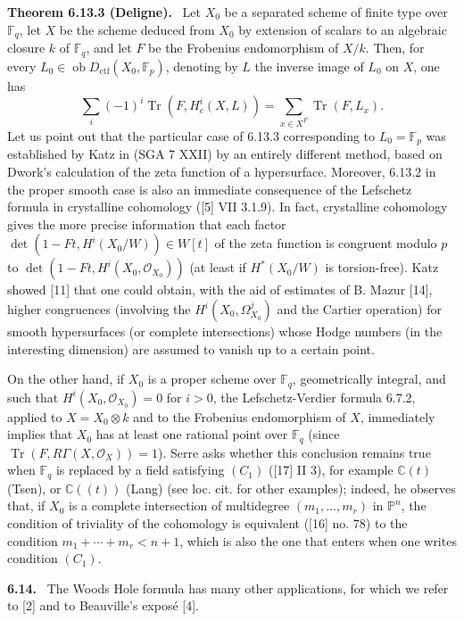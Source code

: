 \documentclass[11pt]{article}
\newenvironment{statement}[1]{\par\medskip\noindent\textbf{#1.}\ }{\par\medskip}
\newcommand{\ob}{\operatorname{ob}}
\providecommand{\ctf}{\mathrm{ctf}}
\providecommand{\Tr}{\operatorname{Tr}}
\providecommand{\OO}{\mathcal O}
\begin{document}
\begin{statement}{Theorem 6.13.3 (Deligne)}
Let $X_0$ be a separated scheme of finite type over $\mathbb F_q$, let $X$ be the scheme deduced from $X_0$ by extension of scalars to an algebraic closure $k$ of $\mathbb F_q$, and let $F$ be the Frobenius endomorphism of $X/k$. Then, for every $L_0\in\ob D_{\ctf}(X_0,\mathbb F_p)$, denoting by $L$ the inverse image of $L_0$ on $X$, one has
\[
\sum_i(-1)^i\Tr(F,H^i_c(X,L))=\sum_{x\in X^F}\Tr(F,L_x).
\]
Let us point out that the particular case of 6.13.3 corresponding to $L_0=\mathbb F_p$ was established by Katz in (SGA 7 XXII) by an entirely different method, based on Dwork's calculation of the zeta function of a hypersurface. Moreover, 6.13.2 in the proper smooth case is also an immediate consequence of the Lefschetz formula in crystalline cohomology ([5] VII 3.1.9). In fact, crystalline cohomology gives the more precise information that each factor $\det(1-Ft,H^i(X_0/W))\in W[t]$ of the zeta function is congruent modulo $p$ to $\det(1-Ft,H^i(X_0,\OO_{X_0}))$ (at least if $H^*(X_0/W)$ is torsion-free). Katz showed [11] that one could obtain, with the aid of estimates of B. Mazur [14], higher congruences (involving the $H^i(X_0,\Omega^j_{X_0})$ and the Cartier operation) for smooth hypersurfaces (or complete intersections) whose Hodge numbers (in the interesting dimension) are assumed to vanish up to a certain point.

On the other hand, if $X_0$ is a proper scheme over $\mathbb F_q$, geometrically integral, and such that $H^i(X_0,\OO_{X_0})=0$ for $i>0$, the Lefschetz-Verdier formula 6.7.2, applied to $X=X_0\otimes k$ and to the Frobenius endomorphism of $X$, immediately implies that $X_0$ has at least one rational point over $\mathbb F_q$ (since $\Tr(F,R\Gamma(X,\OO_X))=1$). Serre asks whether this conclusion remains true when $\mathbb F_q$ is replaced by a field satisfying $(C_1)$ ([17] II 3), for example $\mathbb C(t)$ (Tsen), or $\mathbb C((t))$ (Lang) (see loc. cit. for other examples); indeed, he observes that, if $X_0$ is a complete intersection of multidegree $(m_1,\ldots,m_r)$ in $\mathbb P^n$, the condition of triviality of the cohomology is equivalent ([16] no. 78) to the condition $m_1+\cdots+m_r<n+1$, which is also the one that enters when one writes condition $(C_1)$.
\end{statement}

\begin{statement}{6.14}
The Woods Hole formula has many other applications, for which we refer to [2] and to Beauville's exposé [4].
\end{statement}
\end{document}

